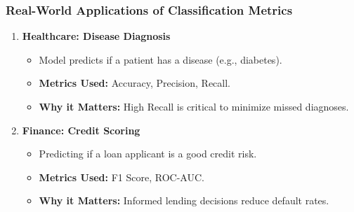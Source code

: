 \documentclass[aspectratio=169]{beamer}
\begin{document}
\begin{frame}[fragile]
    \frametitle{Real-World Applications of Classification Metrics}
    \begin{enumerate}
        \item \textbf{Healthcare: Disease Diagnosis}
            \begin{itemize}
                \item Model predicts if a patient has a disease (e.g., diabetes).
                \item \textbf{Metrics Used:} Accuracy, Precision, Recall.
                \item \textbf{Why it Matters:} High Recall is critical to minimize missed diagnoses.
            \end{itemize}
        \item \textbf{Finance: Credit Scoring}
            \begin{itemize}
                \item Predicting if a loan applicant is a good credit risk.
                \item \textbf{Metrics Used:} F1 Score, ROC-AUC.
                \item \textbf{Why it Matters:} Informed lending decisions reduce default rates.
            \end{itemize}
    \end{enumerate}
\end{frame}
\end{document}
